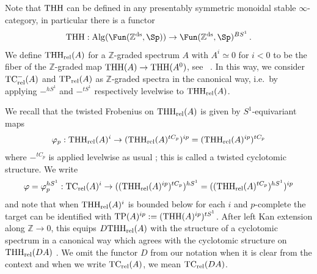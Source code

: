 \documentclass[english,10pt]{amsart}
\newcommand{\rel}{\textup{rel}}
\theoremstyle{definition}
\numberwithin{equation}{section}
\DeclareMathOperator{\tp}{\ensuremath{\textup{TP}}}
\DeclareMathOperator{\thh}{\ensuremath{\textup{THH}}}
\newcommand{\THH}{\thh}
\newcommand{\rntc}{\mathrm{TC}_{\rel}^{-}}
\newcommand{\rtp}{\mathrm{TP}_{\rel}}
\newcommand{\rtc}{\mathrm{TC}_{\rel}}
\newcommand{\rthh}{\mathrm{THH}_{\rel}}
\newcommand{\Alg}{\mathrm{Alg}}
\newcommand{\z}{\mathbb{Z}}
\begin{document}
Note that $\THH$ can be defined in any presentably symmetric monoidal  stable $\infty$-category, in particular there is a functor
\[ \thh : \Alg(\Fun(\mathbb{Z}^{\textup{ds}},\Sp))\to \Fun(\mathbb{Z}^{\textup{ds}},\Sp)^{BS^1} \,.\]
We define $\rthh(A)$ for a 
$\mathbb{Z}$-graded spectrum $A$ with $A^i\simeq 0$ for $i<0$ to be the fiber of the $\z$-graded map $\THH(A)\to \THH(A^0)$, see~ \cite[Lemma B.0.6 ()]{hahn2020redshift}. In this way, we consider $\rntc(A)$ and $\rtp(A)$ as $\z$-graded spectra in the canonical way, i.e.\ by applying $-^{hS^1}$ and $-^{tS^1}$ respectively levelwise to $\rthh(A)$.

We recall that the twisted Frobenius on $\rthh(A)$ is given by $S^1$-equivariant maps
\begin{equation}\label{eq graded frobenius maps}
\varphi_p :\rthh(A)^i \to (\rthh(A)^{tC_p})^{ip}=(\rthh(A)^{ip})^{tC_p}
\end{equation}
where $-^{tC_p}$ is applied levelwise as usual \cite[Appendix A]{antieau2020beilinson}; this is called a twisted cyclotomic structure. We write 
\[\varphi=\varphi_p^{hS^1} :
\rtc(A)^i \to ((\rthh(A)^{ip})^{tC_p})^{hS^1}=((\rthh(A)^{tC_p})^{hS^1})^{ip}
\] 
and note that when $\rthh(A)^i$ is bounded below for each $i$ and $p$-complete the target can be identified with $\tp(A)^{ip}:=(\THH(A)^{ip})^{tS^1}$. 
After left Kan extension along $\mathbb{Z}\to 0$, this equips $D\rthh(A)$ with the structure of a cyclotomic spectrum in a canonical way which agrees with the cyclotomic structure on $\rthh(DA)$ \cite[Example A.16]{antieau2020beilinson}.  
We omit the functor $D$ from our notation when it is clear from the context and when we write $\rtc(A)$, we mean $\rtc(DA)$. 
\end{document}
